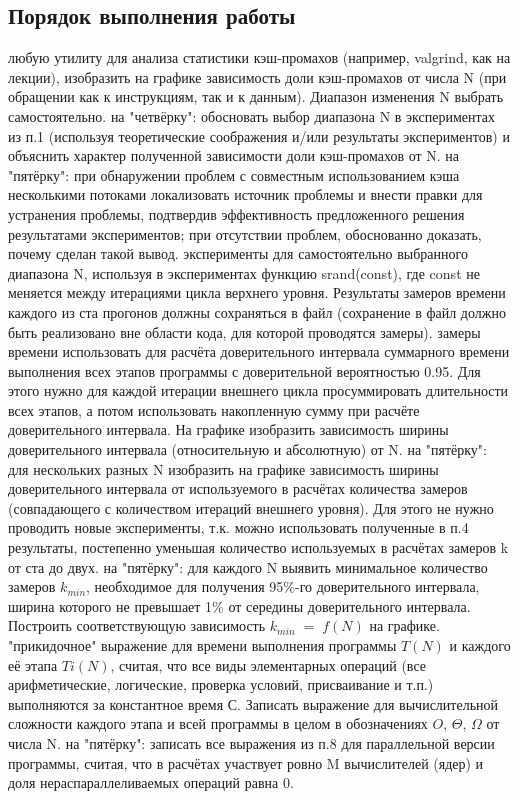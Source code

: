 { %
	\subsection{Порядок выполнения работы}
	\Large
	\begin{enumerate}
		 любую утилиту для анализа статистики кэш-промахов (например, valgrind, как на лекции), изобразить на графике зависимость доли кэш-промахов от числа N (при обращении как к инструкциям, так и к данным). Диапазон изменения N выбрать самостоятельно. 
		 на "четвёрку": обосновать выбор диапазона N в экспериментах из п.1 (используя теоретические соображения и/или результаты экспериментов) и объяснить характер полученной зависимости доли кэш-промахов от N.
		 на "пятёрку": при обнаружении проблем с совместным использованием кэша несколькими потоками локализовать источник проблемы и внести правки для устранения проблемы, подтвердив эффективность предложенного решения результатами экспериментов; при отсутствии проблем, обоснованно доказать, почему сделан такой вывод.
		 эксперименты для самостоятельно выбранного диапазона N, используя в экспериментах функцию srand(const), где const не меняется между итерациями цикла верхнего уровня. Результаты замеров времени каждого из ста прогонов должны сохраняться в файл (сохранение в файл должно быть реализовано вне области кода, для которой проводятся замеры).
		 замеры времени использовать для расчёта доверительного интервала суммарного времени выполнения всех этапов программы с доверительной вероятностью 0.95. Для этого нужно для каждой итерации внешнего цикла просуммировать длительности всех этапов, а потом использовать накопленную сумму при расчёте доверительного интервала. На графике изобразить зависимость ширины доверительного интервала (относительную и абсолютную) от N. 
		 на "пятёрку": для нескольких разных N изобразить на графике зависимость ширины доверительного интервала от используемого в расчётах количества замеров (совпадающего с количеством итераций внешнего уровня). Для этого не нужно проводить новые эксперименты, т.к. можно использовать  полученные в п.4 результаты, постепенно уменьшая количество используемых в расчётах замеров k от ста до двух.
		 на "пятёрку": для каждого N выявить минимальное количество замеров $k_{min}$, необходимое для получения 95\%-го доверительного интервала, ширина которого не превышает 1\% от  середины доверительного интервала. Построить соответствующую зависимость $k_{min}\;=\;f(N)$ на графике.
		 "прикидочное" выражение для времени выполнения программы $T(N)$ и каждого её этапа $Ti(N)$, считая, что все виды элементарных операций (все арифметические, логические, проверка условий, присваивание и т.п.) выполняются за константное время С. Записать выражение для вычислительной сложности каждого этапа и всей программы в целом в обозначениях $O$, $\Theta$, $\Omega$ от числа N. 
		 на "пятёрку": записать все выражения из п.8 для параллельной версии программы, считая, что в расчётах участвует ровно M вычислителей (ядер) и доля нераспараллеливаемых операций равна 0.
	\end{enumerate}
}